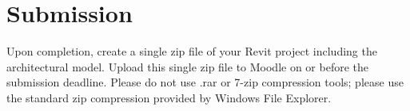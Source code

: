 \section*{Submission}
Upon completion, create a single zip file of your Revit project including the architectural model. Upload this single zip file to Moodle on or before the submission deadline.  Please do not use .rar or 7-zip compression tools; please use the standard zip compression provided by Windows File Explorer.

